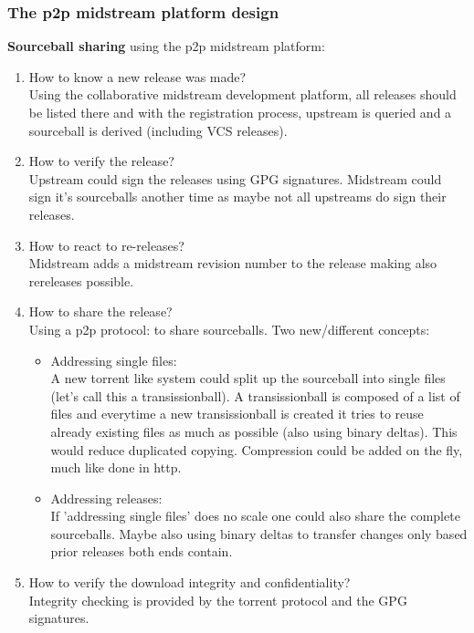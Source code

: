 \documentclass[a4paper,10pt]{article}
\begin{document}
\subsubsection*{The p2p midstream platform design}

\textbf{Sourceball sharing} using the p2p midstream platform:
\begin{enumerate}
\item How to know a new release was made?\\
   Using the collaborative midstream development platform, all releases should be listed there and with the registration process, upstream is queried and a sourceball is derived (including VCS releases).
\item How to verify the release?\\
   Upstream could sign the releases using GPG signatures. Midstream could sign it's sourceballs another time as maybe not all upstreams do sign their releases.
\item How to react to re-releases?\\
   Midstream adds a midstream revision number to the release making also rereleases possible.
\item How to share the release? \\
   Using a p2p protocol: to share sourceballs. Two new/different concepts:
    \begin{itemize}
    \item Addressing single files:\\
    A new torrent like system could split up the sourceball into single files (let's call this a transissionball). A transissionball is composed of a list of files and everytime a new transissionball is created it tries to reuse already existing files as much as possible (also using binary deltas). This would reduce duplicated copying. Compression could be added on the fly, much like done in http.
    \item Addressing releases:\\
    If 'addressing single files' does no scale one could also share the complete sourceballs. Maybe also using binary deltas to transfer changes only based prior releases both ends contain.
    \end{itemize}
\item How to verify the download integrity and confidentiality?\\
Integrity checking is provided by the torrent protocol and the GPG signatures.
\end{enumerate}
\end{document}
